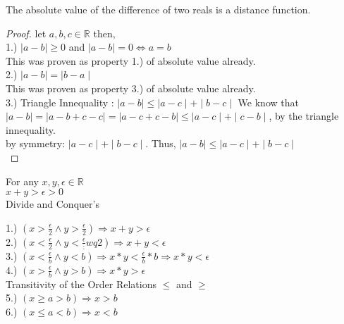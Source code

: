 \documentclass[12pt]{article}
\theoremstyle{definition}
\newenvironment{statement}[2][Section]{\begin{trivlist}
\item[\hskip \labelsep {\bfseries #1}\hskip \labelsep {\bfseries #2.}]}{\end{trivlist}}
\begin{document}
\begin{theorem}
The absolute value of the difference of two reals is a distance function.\\
\begin{proof}
  let $a,b,c \in \mathbb{R} $ then,\\
  1.) $\mid a - b \mid \ge 0$ and $\mid a - b \mid = 0 \iff a = b$\\
  This was proven as property 1.) of absolute value already.\\
  2.) $\mid a - b \mid = \mid b - a \mid$\\
  This was proven as property 3.) of absolute value already.\\
  3.) Triangle Innequality : $\mid a - b \mid \le \mid a- c \mid + \mid b - c \mid $
  We know that $\mid a - b \mid = \mid a - b + c - c \mid = \mid a -c + c - b \mid \le \mid a - c \mid + \mid c - b \mid $, by the triangle innequality.\\
  by symmetry: $\mid a - c \mid + \mid b - c \mid$. Thus, $\mid a - b \mid \le \mid a - c \mid + \mid b - c\mid $\\
\end{proof}
\end{theorem}
\begin{statement}{Ideas!}
  For any $x,y,\epsilon \in \mathbb{R}$\\
   $ x + y > \epsilon > 0 $\\
   Divide and Conquer's

  1.) $(x > \frac{\epsilon}{2} \land y > \frac{\epsilon}{2}) \Rightarrow x + y > \epsilon $\\ 2.) $(x < \frac{\epsilon}{2} \land y < \frac{\epsilon}:wq {2}) \Rightarrow x + y < \epsilon$\\ 3.) $(x < \frac{\epsilon}{b} \land y < b) \Rightarrow x * y < \frac{\epsilon}{b} * b \Rightarrow x * y < \epsilon $\\
  4.) $(x > \frac{\epsilon}{b} \land y > b ) \Rightarrow x * y > \epsilon $\\
  Transitivity of the Order Relations $ \le$ and $\ge$\\
  5.) $(x \ge a > b) \Rightarrow x > b$\\
  6.) $(x \le a < b) \Rightarrow x < b$
\end{statement}
\end{document}
